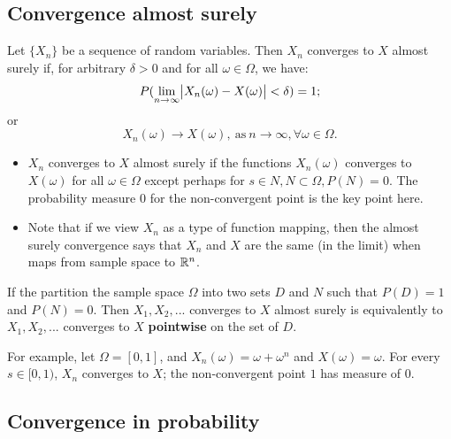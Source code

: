 \begin{refsection}
\begin{remark}[element]
	
\end{remark}

\subsection{Convergence almost surely}
\begin{definition}
\cite[308]{grimmett2001probability}Let $\{X_n\}$ be a sequence of random variables. Then $X_n$ converges to $X$ almost surely if, for arbitrary $\delta > 0$ and for all $\omega \in \Omega$, we have:
$$P(\lim_{n\rightarrow \infty }\abs{X_n(\omega) - X(\omega)}<\delta) = 1;$$
or
$$X_n(\omega) \to X(\omega), ~\text{as}~ n\to \infty,\forall \omega \in \Omega.$$
\end{definition}

\begin{remark}[interpretation]\hfill
\begin{itemize}
	\item $X_n$ converges to $X$ almost surely if the functions $X_n(\omega)$ converges to $X(\omega)$ for all $\omega \in \Omega$ except perhaps for $s\in N,N\subset \Omega,P(N)=0$. The probability measure 0 for the non-convergent point is the key point here. 
	\item Note that if we view $X_n$ as a type of function mapping, then the almost surely convergence says that $X_n$ and $X$ are the same (in the limit) when maps from sample space to $\mathbb{R}^n$.
\end{itemize}
\end{remark}

\begin{remark}
If the partition the sample space $\Omega$ into two sets $D$ and $N$ such that $P(D) = 1$ and $P(N) = 0$. Then $X_1,X_2,...$ converges to $X$ almost surely is equivalently to $X_1,X_2,...$ converges to $X$ \textbf{pointwise} on the set of $D$. 	
\end{remark}

\begin{example}
For example, let $\Omega = [0,1]$, and $X_n(\omega) = \omega + \omega^n$ and $X(\omega) = \omega$. For every $s\in [0,1)$, $X_n$ converges to $X$; the non-convergent point $1$ has measure of 0.
\end{example}


\subsection{Convergence in probability}

\end{refsection}
